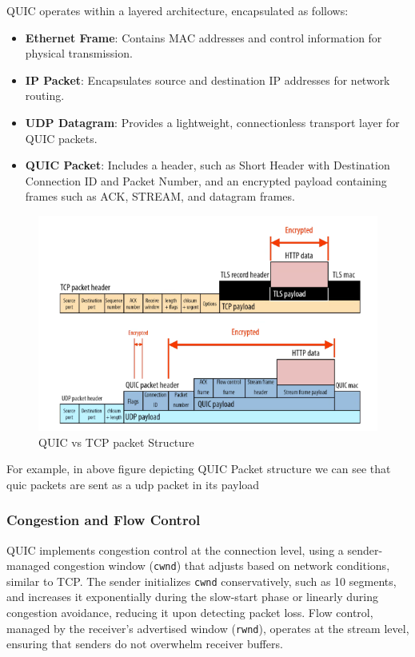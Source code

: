 QUIC operates within a layered architecture, encapsulated as follows:

\begin{itemize}
    \item \textbf{Ethernet Frame}: Contains MAC addresses and control information for physical transmission.
    \item \textbf{IP Packet}: Encapsulates source and destination IP addresses for network routing.
    \item \textbf{UDP Datagram}: Provides a lightweight, connectionless transport layer for QUIC packets.
    \item \textbf{QUIC Packet}: Includes a header, such as Short Header with Destination Connection ID and Packet Number, and an encrypted payload containing frames such as ACK, STREAM, and datagram frames.
\end{itemize}

\begin{figure}[H]
\caption{QUIC vs TCP packet Structure}
\centering
\includegraphics[width=1\textwidth]{SOA/quicntcp.png}
\end{figure}


For example, in above figure \cite{marx2021-http3} depicting QUIC Packet structure we can see that quic packets are sent as a udp packet in its payload


\subsubsection{Congestion and Flow Control}

QUIC implements congestion control at the connection level, using a sender-managed congestion window (\texttt{cwnd}) that adjusts based on network conditions, similar to TCP. The sender initializes \texttt{cwnd} conservatively, such as 10 segments, and increases it exponentially during the slow-start phase or linearly during congestion avoidance, reducing it upon detecting packet loss. Flow control, managed by the receiver’s advertised window (\texttt{rwnd}), operates at the stream level, ensuring that senders do not overwhelm receiver buffers.

